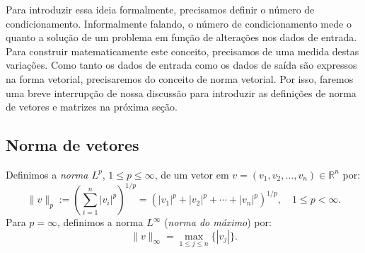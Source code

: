 Para introduzir essa ideia formalmente, precisamos definir o número de condicionamento. Informalmente falando, o número de condicionamento mede o quanto a solução de um problema em função de alterações nos dados de entrada. Para construir matematicamente este conceito, precisamos de uma medida destas variações. Como tanto os dados de entrada como os dados de saída são expressos na forma vetorial, precisaremos do conceito de norma vetorial. Por isso, faremos uma breve interrupção de nossa discussão para introduzir as definições de norma de vetores e matrizes na próxima seção.

\subsection{Norma de vetores}

Definimos a \emph{norma $L^p$}, $1 \leq p \leq \infty$, de um vetor em $v = (v_1, v_2, \ldots, v_n)\in \mathbb{R}^n$ por:
\begin{equation*}
  \|v\|_p := \left(\sum_{i=1}^n |v_i|^p\right)^{1/p} = \left(|v_1|^p+|v_2|^p+ \cdots + |v_n|^p\right)^{1/p},\quad 1\leq p < \infty.
\end{equation*}
Para $p=\infty$, definimos a norma $L^{\infty}$ (\emph{norma do máximo}) por:
\begin{equation*}
  \|v\|_\infty = \max_{1\leq j\leq n} \{|v_j|\}.
\end{equation*}

